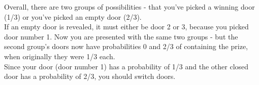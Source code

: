 \documentclass{article}
\begin{document}
Overall, there are two groups of possibilities - that you've picked a winning door (1/3) or you've picked an empty door (2/3).\\

If an empty door is revealed, it must either be door 2 or 3, because you picked door number 1. Now you are presented with the same two groups - but the second group's doors now have probabilities 0 and 2/3 of containing the prize, when originally they were 1/3 each.\\

Since your door (door number 1) has a probability of 1/3 and the other closed door has a probability of 2/3, you should switch doors.
\end{document}
